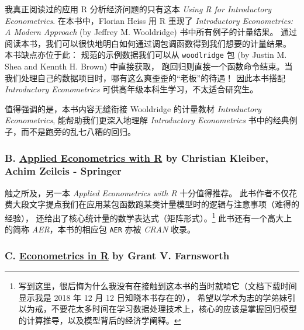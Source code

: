 \documentclass[11pt,hyperref]{ctexart}
\begin{document}
我真正阅读过的应用 R 分析经济问题的只有这本 \emph{Using R for
Introductory Econometrics}. 在本书中，Florian Heiss 用 R 重现了
\emph{Introductory Econometrics: A Modern Approach} (by Jeffrey M.
Wooldridge) 书中所有例子的计量结果。
通过阅读本书，我们可以很快地明白如何通过调包调函数得到我们想要的计量结果。
本书缺点亦位于此： 规范的示例数据我们可以从 \texttt{woodlridge} 包 (by
Justin M. Shea and Kennth H. Brown) 中直接获取，
跑回归则直接一个函数命令结束。当我们处理自己的数据项目时，哪有这么爽歪歪的``老板''的待遇！
因此本书搭配 \emph{Introductory Econometrics}
可供高年级本科生学习，不太适合研究生。

值得强调的是，本书内容无缝衔接 Wooldridge 的计量教材 \emph{Introductory
Econometrics}, 能帮助我们更深入地理解 \emph{Introductory Econometrics}
书中的经典例子，而不是跑旁的乱七八糟的回归。

\hypertarget{b.-applied-econometrics-with-r-by-christian-kleiber-achim-zeileis---springer}{%
\subsubsection{\texorpdfstring{B.
\href{https://eeecon.uibk.ac.at/~zeileis/teaching/AER/}{Applied
Econometrics with R} by Christian Kleiber, Achim Zeileis -
Springer}{B. Applied Econometrics with R by Christian Kleiber, Achim Zeileis - Springer}}\label{b.-applied-econometrics-with-r-by-christian-kleiber-achim-zeileis---springer}}

触之所及，另一本 \emph{Applied Econometrics with R} 十分值得推荐。
此书作者不仅花费大段文字提点我们在应用某包函数跑某类计量模型时的逻辑与注意事项（难得的经验），
还给出了核心统计量的数学表达式（矩阵形式）。\footnote{写到这里，很后悔为什么我没有在接触到这本书的当时就啃它（文档下载时间显示我是
  2018 年 12 月 12 日知晓本书存在的），
  希望以学术为志的学弟妹引以为戒，不要花太多时间在学习数据处理技术上，核心的应该是掌握回归模型的计算推导，以及模型背后的经济学阐释。}
此书还有一个高大上的简称 \emph{AER}，本书的相应包 \texttt{AER} 亦被
\emph{CRAN} 收录。

\hypertarget{c.-econometrics-in-r-by-grant-v.-farnsworth}{%
\subsubsection{\texorpdfstring{C.
\href{https://cran.r-project.org/doc/contrib/Farnsworth-EconometricsInR.pdf}{Econometrics
in R} by Grant V.
Farnsworth}{C. Econometrics in R by Grant V. Farnsworth}}\label{c.-econometrics-in-r-by-grant-v.-farnsworth}}
\end{document}
